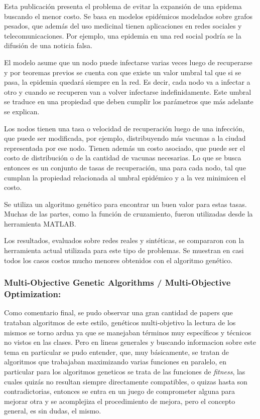 Esta publicación presenta el problema de evitar la expansión de una epidema buscando el menor costo. Se basa en modelos epidémicos modelados sobre grafos pesados, que además del uso medicinal tienen aplicaciones en redes sociales y telecomunicaciones. Por ejemplo, una epidemia en una red social podría se la difusión de una noticia falsa.

El modelo asume que un nodo puede infectarse varias veces luego de recuperarse y por teoremas previos se cuenta con que existe un valor umbral tal que si se pasa, la epidemia quedará siempre en la red. Es decir, cada nodo va a infectar a otro y cuando se recuperen van a volver infectarse indefinidamente. Este umbral se traduce en una propiedad que deben cumplir los parámetros que más adelante se explican.

Los nodos tienen una tasa o velocidad de recuperación luego de una infección, que puede ser modificada, por ejemplo, distribuyendo más vacunas a la ciudad representada por ese nodo. Tienen además un costo asociado, que puede ser el costo de distribución o de la cantidad de vacunas necesarias. Lo que se busca entonces es un conjunto de tasas de recuperación, una para cada nodo, tal que cumplan la propiedad relacionada al umbral epidémico y a la vez minimicen el costo.

Se utiliza un algoritmo genético para encontrar un buen valor para estas tasas. Muchas de las partes, como la función de cruzamiento, fueron utilizadas desde la herramienta MATLAB.

Los resultados, evaluados sobre redes reales y sintéticas, se compararon con la herramienta actual utilizada para este tipo de problemas. Se muestran en casi todos los casos costos mucho menores obtenidos con el algoritmo genético.

\subsubsection*{Multi-Objective Genetic Algorithms / Multi-Objective Optimization:}

Como comentario final, se pudo observar una gran cantidad de papers que trataban algoritmos de este estilo, genéticos multi-objetivo
la lectura de los mismos se torno ardua ya que se manejaban términos muy específicos y técnicos no vistos en las clases. Pero en lineas
generales y buscando informacion\cite{MOO} sobre este tema en particular se pudo entender, que, muy básicamente, se tratan de algoritmos
que trabajaban maximizando varias funciones en paralelo, en particular para los algoritmos geneticos se trata
de las funciones de \emph{fitness}, las cuales quizás no resultan siempre directamente compatibles, o quizas hasta son contradictorias,
entonces se entra en un juego de comprometer alguna para mejorar otra y se acomplejiza el procedimiento de mejora, pero el concepto general,
es sin dudas, el mismo.
